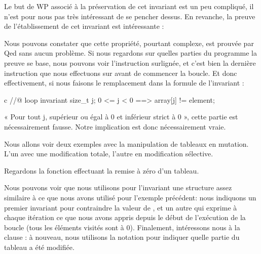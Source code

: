 Le but de WP associé à la préservation de cet invariant est un peu compliqué, il
n'est pour nous pas très intéressant de se pencher dessus. En revanche, la 
preuve de l'établissement de cet invariant est intéressante :





Nous pouvons constater que cette propriété, pourtant complexe, est prouvée par 
Qed sans aucun problème. Si nous regardons sur quelles parties du programme la 
preuve se base, nous pouvons voir l'instruction  surlignée, et c'est 
bien la dernière instruction que nous effectuons sur  avant de commencer
la boucle. Et donc effectivement, si nous faisons le remplacement dans la formule 
de l'invariant :



\begin{CodeBlock}{c}
//@ loop invariant \forall size_t j; 0 <= j < 0 ==> array[j] != element;
\end{CodeBlock}



« Pour tout j, supérieur ou égal à 0 et inférieur strict à 0 », cette partie est
nécessairement fausse. Notre implication est donc nécessairement vraie.





Nous allons voir deux exemples avec la manipulation de tableaux en mutation. 
L'un avec une modification totale, l'autre en modification sélective.





Regardons la fonction effectuant la remise à zéro d'un tableau.






Nous pouvons voir que nous utilisons pour l'invariant une structure assez similaire
à ce que nous avons utilisé pour l'exemple précédent: nous indiquons un premier
invariant pour contraindre la valeur de , et un autre qui exprime
à chaque itération ce que nous avons appris depuis le début de l'exécution de la
boucle (tous les éléments visités sont à $0$). Finalement, intéressons nous à la
clause : à nouveau, nous utilisons la notation 
 pour indiquer quelle partie du tableau a été modifiée.



